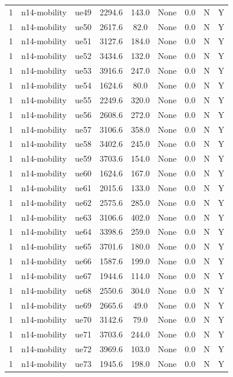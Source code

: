 \begin{table}[ht]
\begin{tabular}{|c|c|c|c|c|c|c|c|c|}
1 & n14-mobility & ue49 & 2294.6 & 143.0 & None & 0.0 & N & Y \\
1 & n14-mobility & ue50 & 2617.6 & 82.0 & None & 0.0 & N & Y \\
1 & n14-mobility & ue51 & 3127.6 & 184.0 & None & 0.0 & N & Y \\
1 & n14-mobility & ue52 & 3434.6 & 132.0 & None & 0.0 & N & Y \\
1 & n14-mobility & ue53 & 3916.6 & 247.0 & None & 0.0 & N & Y \\
1 & n14-mobility & ue54 & 1624.6 & 80.0 & None & 0.0 & N & Y \\
1 & n14-mobility & ue55 & 2249.6 & 320.0 & None & 0.0 & N & Y \\
1 & n14-mobility & ue56 & 2608.6 & 272.0 & None & 0.0 & N & Y \\
1 & n14-mobility & ue57 & 3106.6 & 358.0 & None & 0.0 & N & Y \\
1 & n14-mobility & ue58 & 3402.6 & 245.0 & None & 0.0 & N & Y \\
1 & n14-mobility & ue59 & 3703.6 & 154.0 & None & 0.0 & N & Y \\
1 & n14-mobility & ue60 & 1624.6 & 167.0 & None & 0.0 & N & Y \\
1 & n14-mobility & ue61 & 2015.6 & 133.0 & None & 0.0 & N & Y \\
1 & n14-mobility & ue62 & 2575.6 & 285.0 & None & 0.0 & N & Y \\
1 & n14-mobility & ue63 & 3106.6 & 402.0 & None & 0.0 & N & Y \\
1 & n14-mobility & ue64 & 3398.6 & 259.0 & None & 0.0 & N & Y \\
1 & n14-mobility & ue65 & 3701.6 & 180.0 & None & 0.0 & N & Y \\
1 & n14-mobility & ue66 & 1587.6 & 199.0 & None & 0.0 & N & Y \\
1 & n14-mobility & ue67 & 1944.6 & 114.0 & None & 0.0 & N & Y \\
1 & n14-mobility & ue68 & 2550.6 & 304.0 & None & 0.0 & N & Y \\
1 & n14-mobility & ue69 & 2665.6 & 49.0 & None & 0.0 & N & Y \\
1 & n14-mobility & ue70 & 3142.6 & 79.0 & None & 0.0 & N & Y \\
1 & n14-mobility & ue71 & 3703.6 & 244.0 & None & 0.0 & N & Y \\
1 & n14-mobility & ue72 & 3969.6 & 103.0 & None & 0.0 & N & Y \\
1 & n14-mobility & ue73 & 1945.6 & 198.0 & None & 0.0 & N & Y \\

\end{tabular}
\end{table}
